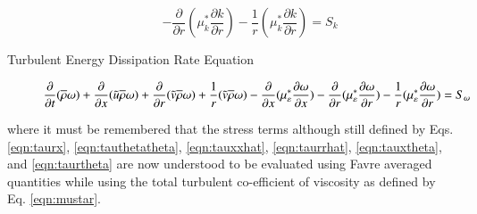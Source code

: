 \begin{description}
\begin{displaymath}
	- \frac{\partial}{\partial r}(\mu^*_k\frac{\partial k}{\partial r}) 
	- \frac{1}{r}(\mu^*_k\frac{\partial k}{\partial r}) = S_k
	\end{displaymath}	
	\item[Turbulent Energy Dissipation Rate Equation]
	\begin{displaymath}
	 \frac{\partial}{\partial t}(\overline{\rho}\omega)
	+ \frac{\partial}{\partial x}(\tilde u\overline{\rho}\omega)+ \frac{\partial}{\partial r}(\tilde v\overline{\rho}\omega)
	+ \frac{1}{r}(\tilde v\overline{\rho}\omega) \\ \\
	- \frac{\partial}{\partial x}(\mu^*_{\varepsilon}
	\frac{\partial \omega}{\partial x}) - \frac{\partial}{\partial r}(\mu^*_{\varepsilon}\frac{\partial \omega}{\partial r})
	- \frac{1}{r}(\mu^*_{\varepsilon}\frac{\partial \omega}{\partial r})
	 =  S_\omega
	\end{displaymath}
\end{description}

	where it must be remembered that the stress terms although still defined by Eqs. \ref{eqn:taurx},
\ref{eqn:tauthetatheta}, \ref{eqn:tauxxhat}, \ref{eqn:taurrhat}, \ref{eqn:tauxtheta}, and \ref{eqn:taurtheta} are
now understood to be evaluated using Favre averaged quantities while using the total turbulent co-efficient of 
viscosity as defined by Eq. \ref{eqn:mustar}.
